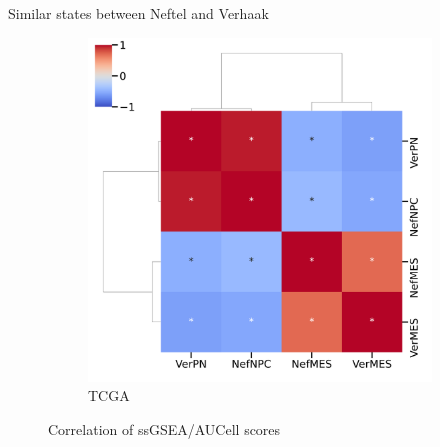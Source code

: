 \documentclass[aspectratio=169,9pt]{beamer}
\begin{document}
\begin{frame}{Similar states between Neftel and Verhaak}
\begin{adjustwidth}{-5cm}{-5cm}
\begin{figure}
\begin{subfigure}[c]{0.4\textwidth}
                    \includegraphics[width=\textwidth]{GSEA_TCGA_corrplot_2D}
                    \caption{TCGA}
                \end{subfigure}
                \caption{Correlation of ssGSEA/AUCell scores}
            \end{figure}
        \end{adjustwidth}
    \end{frame}
\end{document}
